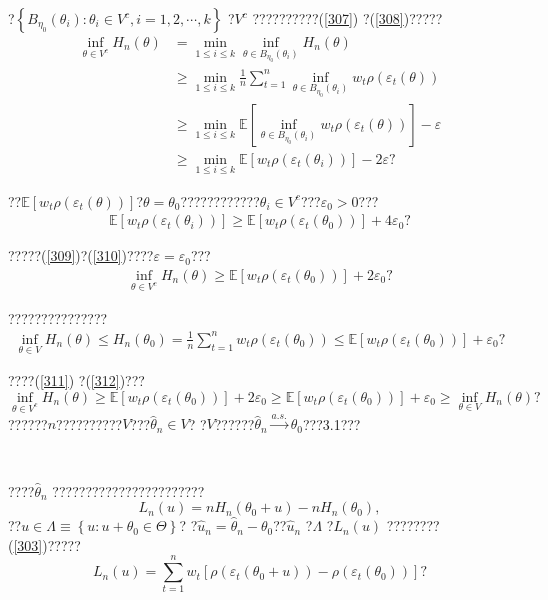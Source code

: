 \documentclass[a4paper,12pt,openany,oneside,utf-8]{ctexbook}
\begin{document}
	\noindent ?$\left\{B_{\eta_0}(\theta_i):\theta_i\in V^c,i=1,2,\cdots,k\right\}$ ?$V^c$ ??????????(\ref{307}) ?(\ref{308})?????
	\begin{align}\label{309}
		\inf_{\theta\in V^c}H_n(\theta)&=\min_{1\le i\le k}\inf_{\theta\in B_{\eta_0}(\theta_i)}H_n(\theta)\nonumber\\
		&\ge\min_{1\le i\le k}\frac{1}{n}\sum_{t=1}^n\inf_{\theta\in B_{\eta_0}(\theta_i)}w_t\rho(\varepsilon_t(\theta))\nonumber\\
		&\ge\min_{1\le i\le k}\mathbb{E}\left[\inf_{\theta\in B_{\eta_0}(\theta_i)}w_t\rho(\varepsilon_t(\theta))\right]-\varepsilon\nonumber\\
		&\ge\min_{1\le i\le k}\mathbb{E}[w_t\rho(\varepsilon_t(\theta_i))]-2\varepsilon\mbox{?}
	\end{align}
	
	\noindent ??$\mathbb{E}[w_t\rho(\varepsilon_t(\theta))]$?$\theta=\theta_0$????????????$\theta_i\in V^c$???$\varepsilon_0>0$???
	\begin{align}\label{310}
		\mathbb{E}[w_t\rho(\varepsilon_t(\theta_i))]\ge\mathbb{E}[w_t\rho(\varepsilon_t(\theta_0))]+4\varepsilon_0\mbox{?}
	\end{align}
	
	\noindent ?????(\ref{309})?(\ref{310})????$\varepsilon=\varepsilon_0$???
	\begin{align}\label{311}
		\inf_{\theta\in V^c}H_n(\theta)\ge\mathbb{E}[w_t\rho(\varepsilon_t(\theta_0))]+2\varepsilon_0\mbox{?}
	\end{align}
	
	???????????????
	\begin{align}\label{312}
		\inf_{\theta\in V}H_n(\theta)\le H_n(\theta_0)=\frac{1}{n}\sum_{t=1}^nw_t\rho(\varepsilon_t(\theta_0))\le\mathbb{E}[w_t\rho(\varepsilon_t(\theta_0))]+\varepsilon_0\mbox{?}
	\end{align}
	
	\noindent ????(\ref{311}) ?(\ref{312})???
	$$\inf_{\theta\in V^c}H_n(\theta)\ge\mathbb{E}[w_t\rho(\varepsilon_t(\theta_0))]+2\varepsilon_0\ge\mathbb{E}[w_t\rho(\varepsilon_t(\theta_0))]+\varepsilon_0\ge\inf_{\theta\in V}H_n(\theta)\mbox{?}$$
	??????$n$??????????$V$???$\hat{\theta}_n\in V$? ?$V$??????$\hat{\theta}_n\overset{a.s.}{\to}\theta_0$???3.1???
	
	\
	
	????$\hat{\theta}_n$ ??????????????????????? $$L_n(u)=nH_n(\theta_0+u)-nH_n(\theta_0),$$ ??$u\in\Lambda\equiv\left\{u:u+\theta_0\in\Theta\right\}$? ?$\hat{u}_n=\hat{\theta}_n-\theta_0$??$\hat{u}_n$ ?$\Lambda$ ?$L_n(u)$ ????????(\ref{303})?????
	\begin{equation}\label{304}
		L_n(u)=\sum_{t=1}^nw_t\left[\rho\left(\varepsilon_t(\theta_0+u)\right)-\rho\left(\varepsilon_t(\theta_0)\right)\right]\mbox{?}
	\end{equation}
	
\end{document}

